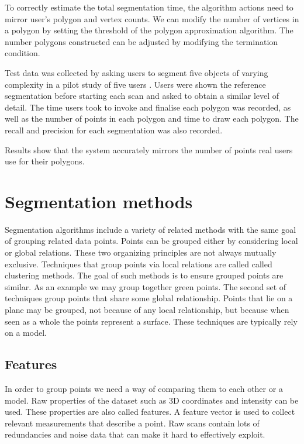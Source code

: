 To correctly estimate the total segmentation time, the algorithm actions need to mirror user's polygon and vertex counts. We can modify the number of vertices in a polygon by setting the threshold of the polygon approximation algorithm. The number polygons constructed can be adjusted by modifying the termination condition.

Test data was collected by asking users to segment five objects of varying complexity in a pilot study of five users \cite{Mathematical1910}. Users were shown the reference segmentation before starting each scan and asked to obtain a similar level of detail. The time users took to invoke and finalise each polygon was recorded, as well as the number of points in each polygon and time to draw each polygon. The recall and precision for each segmentation was also recorded.

Results show that the system accurately mirrors the number of points real users use for their polygons.



\section{Segmentation methods}

Segmentation algorithms include a variety of related methods with the same goal of grouping related data points. Points can be grouped either by considering local or global relations. These two organizing principles are not always mutually exclusive. Techniques that group points via local relations are called called clustering methods. The goal of such methods is to ensure grouped points are similar. As an example we may group together green points. The second set of techniques group points that share some global relationship. Points that lie on a plane may be grouped, not because of any local relationship, but because when seen as a whole the points represent a surface. These techniques are typically rely on a model.

\subsection{Features}\label{sec:features}

In order to group points we need a way of comparing them to each other or a model. Raw properties of the dataset such as 3D coordinates and intensity can be used. These properties are also called features. A feature vector is used to collect relevant measurements that describe a point. Raw scans contain lots of redundancies and noise data that can make it hard to effectively exploit.

